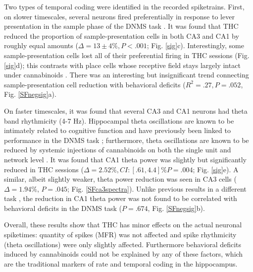 \documentclass[11pt,a4paper,final]{article}
\begin{document}
Two types of temporal coding were identified in the recorded spiketrains.
First, on slower timescales, several neurons fired preferentially in response to lever presentation in the sample phase of the DNMS task \citep{hampson99}.
It was found that THC reduced the proportion of sample-presentation cells in both CA3 and CA1 by roughly equal amounts ($\Delta=13\pm4\%, P<.001$; Fig. \ref{sig}c).
Interestingly, some sample-presentation cells lost all of their preferential firing in THC sessions (Fig.\ref{sig}d); this contrasts with place cells whose receptive field stays largely intact under cannabinoids \citep{robbe09}.
There was an interesting but insignificant trend connecting sample-presentation cell reduction with behavioral deficits ($R^2=.27, P=.052$, Fig. \ref{SFnegsig}a).

On faster timescales, it was found that several CA3 and CA1 neurons had theta band rhythmicity (4-7 Hz).
Hippocampal theta oscillations are known to be intimately related to cognitive function \citep{buzsaki06,colgin13,moser13} and have previously been linked to performance in the DNMS task \citep{hasselmo10};
furthermore, theta oscillations are known to be reduced by systemic injections of cannabinoids on both the single unit \citep{robbe06} and network level \citep{kocsis08}.
It was found that CA1 theta power was slightly but significantly reduced in THC sessions ($\Delta=2.52\%, CI:[.61,4.4]\% P=.004$; Fig. \ref{sig}e).
A similar, albeit slightly weaker, theta power reduction was seen in CA3 cells ($\Delta=1.94\%$, $P=.045$; Fig. \ref{SFca3spectra}).
Unlike previous results in a different task \citep{robbe06}, the reduction in CA1 theta power was not found to be correlated with behavioral deficits in the DNMS task ($P=.674$, Fig. \ref{SFnegsig}b).

Overall, these results show that THC has minor effects on the actual neuronal spiketimes: quantity of spikes (MFR) was not affected and spike rhythmicity (theta oscillations) were only slightly affected.
Furthermore behavioral deficits induced by cannabinoids could not be explained by any of these factors, which are the traditional markers of rate and temporal coding in the hippocampus.
\end{document}
